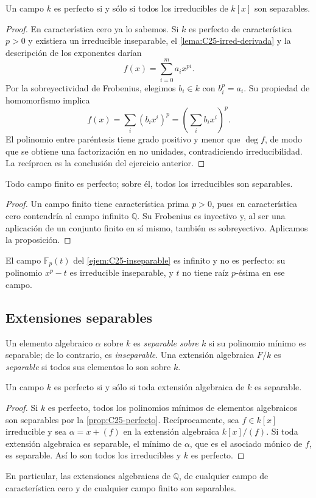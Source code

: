 \begin{prop}\label{prop:C25-perfecto}
Un campo $k$ es perfecto si y sólo si todos los irreducibles de $k[x]$ son separables.
\end{prop}
\begin{proof}
En característica cero ya lo sabemos. Si $k$ es perfecto de característica $p>0$ y existiera un irreducible inseparable, el \cref{lema:C25-irred-derivada} y la descripción de los exponentes darían
\[
f(x)=\sum_{i=0}^m a_i x^{pi}.
\]
Por la sobreyectividad de Frobenius, elegimos $b_i\in k$ con $b_i^p=a_i$. Su propiedad de homomorfismo implica
\[
f(x)=\sum_i(b_ix^i)^p=\left(\sum_i b_ix^i\right)^p.
\]
El polinomio entre paréntesis tiene grado positivo y menor que $\deg f$, de modo que se obtiene una factorización en no unidades, contradiciendo irreducibilidad. La recíproca es la conclusión del ejercicio anterior.
\end{proof}

\begin{coro}
Todo campo finito es perfecto; sobre él, todos los irreducibles son separables.
\end{coro}
\begin{proof}
Un campo finito tiene característica prima $p>0$, pues en característica cero contendría al campo infinito $\mathbb Q$. Su Frobenius es inyectivo y, al ser una aplicación de un conjunto finito en sí mismo, también es sobreyectivo. Aplicamos la proposición.
\end{proof}
El campo $\mathbb F_p(t)$ del \cref{ejem:C25-inseparable} es infinito y no es perfecto: su polinomio $x^p-t$ es irreducible inseparable, y $t$ no tiene raíz $p$-ésima en ese campo.

\subsection{Extensiones separables}\label{tema:25-3-3a}
\begin{defi}
Un elemento algebraico $\alpha$ sobre $k$ es \emph{separable sobre $k$} si su polinomio mínimo es separable; de lo contrario, es \emph{inseparable}. Una extensión algebraica $F/k$ es \emph{separable} si todos sus elementos lo son sobre $k$.
\end{defi}

\begin{prop}
Un campo $k$ es perfecto si y sólo si toda extensión algebraica de $k$ es separable.
\end{prop}
\begin{proof}
Si $k$ es perfecto, todos los polinomios mínimos de elementos algebraicos son separables por la \cref{prop:C25-perfecto}. Recíprocamente, sea $f\in k[x]$ irreducible y sea $\alpha=x+(f)$ en la extensión algebraica $k[x]/(f)$. Si toda extensión algebraica es separable, el mínimo de $\alpha$, que es el asociado mónico de $f$, es separable. Así lo son todos los irreducibles y $k$ es perfecto.
\end{proof}
En particular, las extensiones algebraicas de $\mathbb Q$, de cualquier campo de característica cero y de cualquier campo finito son separables.
